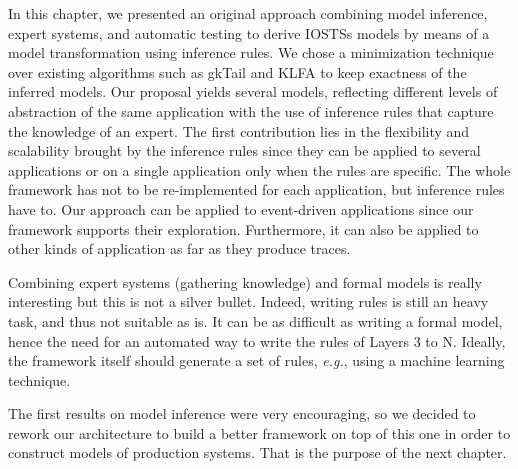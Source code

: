 In this chapter, we presented an original approach combining
model inference, expert systems, and automatic testing to derive
IOSTSs models by means of a model transformation using inference
rules.  We chose a minimization technique over existing
algorithms such as gkTail and KLFA to keep exactness of the
inferred models. Our proposal yields several models, reflecting
different levels of abstraction of the same application with the
use of inference rules that capture the knowledge of an expert.
The first contribution lies in the flexibility and scalability
brought by the inference rules since they can be applied to
several applications or on a single application only when the
rules are specific. The whole framework has not to be
re-implemented for each application, but inference rules have to.
Our approach can be applied to event-driven applications since
our framework supports their exploration. Furthermore, it can
also be applied to other kinds of application as far as they
produce traces.

Combining expert systems (gathering knowledge) and formal models
is really interesting but this is not a silver bullet. Indeed,
writing rules is still an heavy task, and thus not suitable as
is. It can be as difficult as writing a formal model, hence the
need for an automated way to write the rules of Layers 3 to N.
Ideally, the framework itself should generate a set of rules,
\emph{e.g.}, using a machine learning technique.

The first results on model inference were very encouraging, so we
decided to rework our architecture to build a better framework on
top of this one in order to construct models of production
systems. That is the purpose of the next chapter.
